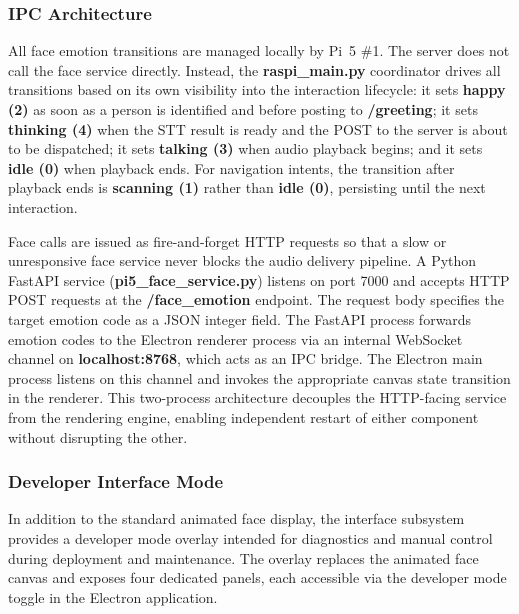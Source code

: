 \subsubsection{IPC Architecture}

All face emotion transitions are managed locally by Pi~5 \#1. The server does not call the face service directly. Instead, the \textbf{raspi\_main.py} coordinator drives all transitions based on its own visibility into the interaction lifecycle: it sets \textbf{happy (2)} as soon as a person is identified and before posting to \textbf{/greeting}; it sets \textbf{thinking (4)} when the STT result is ready and the POST to the server is about to be dispatched; it sets \textbf{talking (3)} when audio playback begins; and it sets \textbf{idle (0)} when playback ends. For navigation intents, the transition after playback ends is \textbf{scanning (1)} rather than \textbf{idle (0)}, persisting until the next interaction.

Face calls are issued as fire-and-forget HTTP requests so that a slow or unresponsive face service never blocks the audio delivery pipeline. A Python FastAPI service (\textbf{pi5\_face\_service.py}) listens on port 7000 and accepts HTTP POST requests at the \textbf{/face\_emotion} endpoint. The request body specifies the target emotion code as a JSON integer field. The FastAPI process forwards emotion codes to the Electron renderer process via an internal WebSocket channel on \textbf{localhost:8768}, which acts as an IPC bridge. The Electron main process listens on this channel and invokes the appropriate canvas state transition in the renderer. This two-process architecture decouples the HTTP-facing service from the rendering engine, enabling independent restart of either component without disrupting the other.

\subsubsection{Developer Interface Mode}

In addition to the standard animated face display, the interface subsystem provides a developer mode overlay intended for diagnostics and manual control during deployment and maintenance. The overlay replaces the animated face canvas and exposes four dedicated panels, each accessible via the developer mode toggle in the Electron application.

